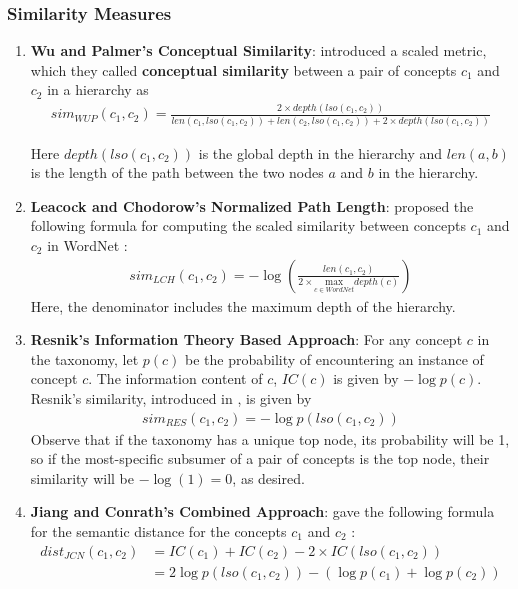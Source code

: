 \subsubsection{Similarity Measures} 
\label{section:similarityMeasures}
\begin{enumerate}
\item \textbf{Wu and Palmer's Conceptual Similarity}: \citep{WuPalmer:1994} introduced a scaled metric, which they called \textbf{conceptual similarity} between a pair of concepts $c_1$ and $c_2$ in a hierarchy as
\begin{align}
sim_{WUP}(c_1,c_2) = \frac{2 \times depth(lso(c_1,c_2))}{len(c_1,lso(c_1,c_2)) + len(c_2,lso(c_1,c_2)) + 2 \times depth(lso(c_1,c_2))} \label{eq:WUP}
\end{align}

Here $depth(lso(c_1,c_2))$ is the global depth in the hierarchy and $len(a,b)$ is the length of the path between the two nodes $a$ and $b$ in the hierarchy.

\item \textbf{Leacock and Chodorow's Normalized Path Length}: \citep{LCH:1998} proposed the following formula for computing the scaled similarity between concepts $c_1$ and $c_2$ in WordNet :
\begin{align}
 sim_{LCH}(c_1,c_2) = -\log\left(\frac{len(c_1,c_2)}{2 \times \underset{c \in WordNet}{\mbox{max}} depth(c)}\right) \label{eq:LCH}
\end{align}
Here, the denominator includes the maximum depth of the hierarchy.

\item \textbf{Resnik's Information Theory Based Approach}: For any concept $c$ in the taxonomy, let $p(c)$ be the probability of encountering an instance of concept $c$. The information content of $c$, $IC(c)$ is given by $-\log p(c)$. Resnik's similarity, introduced in \citep{Resnik:1995}, is given by
\begin{align}
sim_{RES}(c_1,c_2) = - \log p (lso(c_1,c_2)) \label{eq:Resnik}
\end{align}
Observe that if the taxonomy has a unique top node, its probability will be 1, so if the most-specific subsumer of a pair of concepts is the top node, their similarity will be $- \log(1) = 0$, as desired.

\item \textbf{Jiang and Conrath's Combined Approach}: \citep{JCN:1997} gave the following formula for the semantic distance for the concepts $c_1$ and $c_2$ :
\begin{align}
dist_{JCN}(c_1,c_2) &= IC(c_1) + IC(c_2) - 2 \times  IC(lso(c_1,c_2)) \label{eq:JC1}\\
&= 2 \log p(lso(c_1,c_2)) - (\log p(c_1) + \log p(c_2)) \label{eq:JC2}
\end{align}


\end{enumerate}
